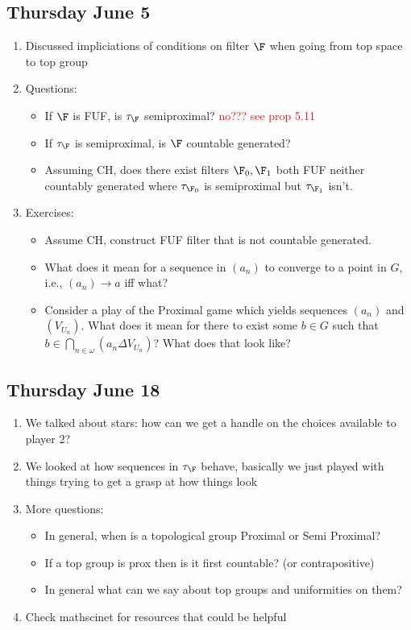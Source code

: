 \documentclass{article}
\begin{document}
\subsection*{Thursday June 5}
\begin{enumerate}
    \item Discussed impliciations of conditions on filter \(\F\) when going from top space to top group 
    \item Questions:
    \begin{itemize}
        \item If \(\F\) is FUF, is \(\tau_{\F}\) semiproximal? \textcolor{red}{no??? see prop 5.11}
        \item If \(\tau_{\F}\) is semiproximal, is \(\F\) countable generated?
        \item Assuming CH, does there exist filters \(\F_0, \F_1\) both FUF neither countably generated where \(\tau_{\F_0}\) is semiproximal but \(\tau_{\F_1}\) isn't.
    \end{itemize}    
    \item Exercises: 
    \begin{itemize}
        \item Assume CH, construct FUF filter that is not countable generated. \checkmark
        \item What does it mean for a sequence in \((a_n)\) to converge to a point in \(G\), i.e., \((a_n)\to a\) iff what? 
        \item Consider a play of the Proximal game which yields sequences \((a_n)\) and \((V_{U_n})\). What does it mean for there to exist some \(b \in G\) such that \(b \in \bigcap_{n \in \omega}(a_n \Delta V_{U_n})\)? What does that look like?
    \end{itemize}
    \end{enumerate}

\subsection*{Thursday June 18}
\begin{enumerate}
    \item We talked about stars: how can we get a handle on the choices available to player 2?
    \item We looked at how sequences in \(\tau_{\F}\) behave, basically we just played with things trying to get a grasp at how things look
    \item More questions:
    \begin{itemize}
        \item In general, when is a topological group Proximal or Semi Proximal?
        \item If a top group is prox then is it first countable? (or contrapositive)
        \item In general what can we say about top groups and uniformities on them?
    \end{itemize}
    \item Check mathscinet for resources that could be helpful
\end{enumerate}
\end{document}
